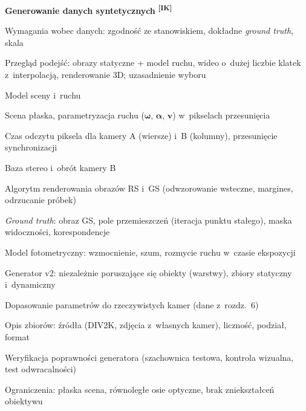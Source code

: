 \documentclass[11pt,a4paper]{article}
\newcommand{\IK}{\textsuperscript{\textbf{[IK]}}}
\begin{document}
\begin{toc}
\item \textbf{Generowanie danych syntetycznych} \IK
  \begin{toc}
    \item Wymagania wobec danych: zgodność ze stanowiskiem, dokładne \emph{ground truth}, skala
    \item Przegląd podejść: obrazy statyczne + model ruchu, wideo o~dużej liczbie klatek
          z~interpolacją, renderowanie 3D; uzasadnienie wyboru
    \item Model sceny i~ruchu
      \begin{toc}
        \item Scena płaska, parametryzacja ruchu ($\boldsymbol\omega$, $\boldsymbol\alpha$, $\mathbf v$) w~pikselach przesunięcia
        \item Czas odczytu piksela dla kamery A (wiersze) i~B (kolumny), przesunięcie synchronizacji
        \item Baza stereo i~obrót kamery B
      \end{toc}
    \item Algorytm renderowania obrazów RS i~GS (odwzorowanie wsteczne, margines, odrzucanie próbek)
    \item \emph{Ground truth}: obraz GS, pole przemieszczeń (iteracja punktu stałego), maska widoczności, korespondencje
    \item Model fotometryczny: wzmocnienie, szum, rozmycie ruchu w~czasie ekspozycji
    \item Generator v2: niezależnie poruszające się obiekty (warstwy), zbiory statyczny i~dynamiczny
    \item Dopasowanie parametrów do rzeczywistych kamer (dane z~rozdz.~6)
    \item Opis zbiorów: źródła (DIV2K, zdjęcia z~własnych kamer), liczność, podział, format
    \item Weryfikacja poprawności generatora (szachownica testowa, kontrola wizualna, test odwracalności)
    \item Ograniczenia: płaska scena, równoległe osie optyczne, brak zniekształceń obiektywu
  \end{toc}


\end{toc}
\end{document}

